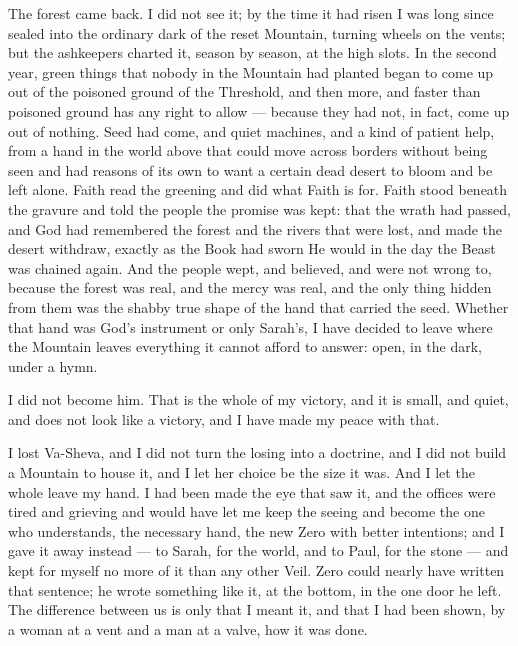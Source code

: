 \ornament

The forest came back. I did not see it; by the time it had risen I was long since sealed into the ordinary dark of the reset Mountain, turning wheels on the vents; but the ashkeepers charted it, season by season, at the high slots. In the second year, green things that nobody in the Mountain had planted began to come up out of the poisoned ground of the Threshold, and then more, and faster than poisoned ground has any right to allow --- because they had not, in fact, come up out of nothing. Seed had come, and quiet machines, and a kind of patient help, from a hand in the world above that could move across borders without being seen and had reasons of its own to want a certain dead desert to bloom and be left alone. Faith read the greening and did what Faith is for. Faith stood beneath the gravure and told the people the promise was kept: that the wrath had passed, and God had remembered the forest and the rivers that were lost, and made the desert withdraw, exactly as the Book had sworn He would in the day the Beast was chained again. And the people wept, and believed, and were not wrong to, because the forest was real, and the mercy was real, and the only thing hidden from them was the shabby true shape of the hand that carried the seed. Whether that hand was God's instrument or only Sarah's, I have decided to leave where the Mountain leaves everything it cannot afford to answer: open, in the dark, under a hymn.\par

\ornament

I did not become him. That is the whole of my victory, and it is small, and quiet, and does not look like a victory, and I have made my peace with that.\par

I lost Va-Sheva, and I did not turn the losing into a doctrine, and I did not build a Mountain to house it, and I let her choice be the size it was. And I let the whole leave my hand. I had been made the eye that saw it, and the offices were tired and grieving and would have let me keep the seeing and become the one who understands, the necessary hand, the new Zero with better intentions; and I gave it away instead --- to Sarah, for the world, and to Paul, for the stone --- and kept for myself no more of it than any other Veil. Zero could nearly have written that sentence; he wrote something like it, at the bottom, in the one door he left. The difference between us is only that I meant it, and that I had been shown, by a woman at a vent and a man at a valve, how it was done.\par

